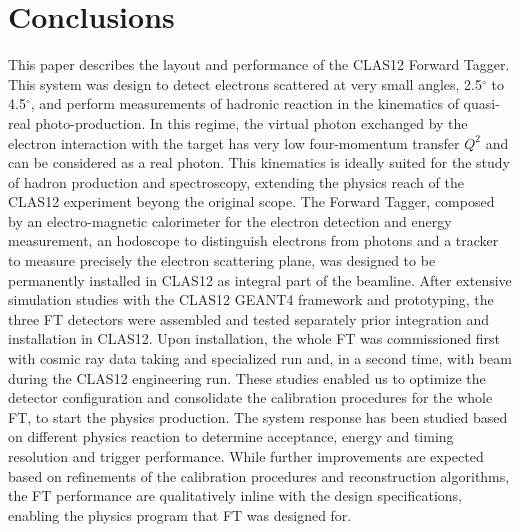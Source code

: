 \section{Conclusions}
This paper describes the layout and performance of the CLAS12 Forward Tagger. This system was design to detect electrons scattered at very small angles, 2.5$^\circ$ to 4.5$^\circ$, and perform measurements of hadronic reaction in the kinematics of quasi-real photo-production. In this regime, the virtual photon exchanged by the electron interaction with the target has very low four-momentum transfer $Q^2$ and can be considered as a real photon. This kinematics is ideally suited for the study of hadron production and spectroscopy,  extending the physics reach of the CLAS12 experiment beyong the original scope.
The Forward Tagger, composed by an electro-magnetic calorimeter for the electron detection and energy measurement, an hodoscope to distinguish electrons from photons and a tracker to measure precisely the electron scattering plane, was designed to be permanently installed in CLAS12 as integral part of the beamline. After extensive simulation studies with the CLAS12 GEANT4 framework and prototyping, the three FT detectors were assembled and tested separately prior integration and installation in CLAS12. Upon installation, the whole FT was commissioned first with cosmic ray data taking and specialized run and, in a second time, with beam during the CLAS12 engineering run. These studies enabled us to optimize the detector configuration and consolidate the calibration procedures for the whole FT, to start the physics production. The system response has been studied based on different physics reaction to determine acceptance, energy and timing resolution and trigger performance. While further improvements are expected based on refinements of the calibration procedures and reconstruction algorithms, the FT performance are qualitatively inline with the design specifications, enabling the physics program that FT was designed for.